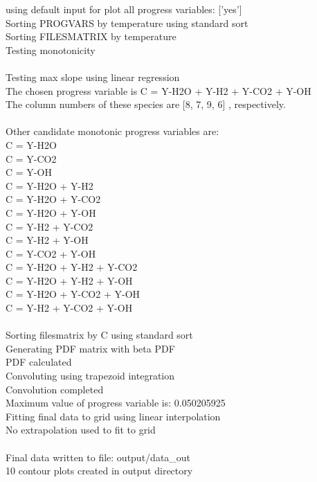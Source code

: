 \documentclass[11pt]{article}
\begin{document}
\hfill\begin{minipage}{\dimexpr\textwidth-3cm}


using default input for plot all progress variables:
['yes'] \\
Sorting PROGVARS by temperature using standard sort\\
Sorting FILESMATRIX by temperature\\
Testing monotonicity \\
\\
Testing max slope using linear regression\\
The chosen progress variable is C = Y-H2O + Y-H2 + Y-CO2 + Y-OH \\
The column numbers of these species are  [8, 7, 9, 6] , respectively.\\
\\
Other candidate monotonic progress variables are:\\
C = Y-H2O \\
C = Y-CO2 \\
C = Y-OH \\
C = Y-H2O + Y-H2 \\ 
C = Y-H2O + Y-CO2 \\
C = Y-H2O + Y-OH \\
C = Y-H2 + Y-CO2 \\
C = Y-H2 + Y-OH \\
C = Y-CO2 + Y-OH \\
C = Y-H2O + Y-H2 + Y-CO2 \\ 
C = Y-H2O + Y-H2 + Y-OH \\
C = Y-H2O + Y-CO2 + Y-OH \\
C = Y-H2 + Y-CO2 + Y-OH \\
\\
Sorting filesmatrix by C using standard sort\\
Generating PDF matrix with beta PDF\\
PDF calculated\\
Convoluting using trapezoid integration\\
Convolution completed\\
Maximum value of progress variable is: 0.050205925\\
Fitting final data to grid using linear interpolation\\
No extrapolation used to fit to grid\\
\\
Final data written to file: output/data\_out\\
10 contour plots created in output directory 

\xdef\tpd{\the\prevdepth}
\end{minipage}
\end{document}
